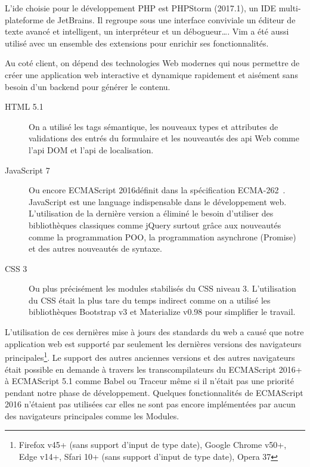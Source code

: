 L'ide choisie pour le développement PHP est PHPStorm (2017.1), un IDE
multi-plateforme de JetBrains. Il regroupe sous une interface conviviale un
éditeur de texte avancé et intelligent, un interpréteur et un débogueur\ldots.
Vim a été aussi utilisé avec un ensemble des extensions pour enrichir ses
fonctionnalités.

Au coté client, on dépend des technologies Web modernes qui nous permettre de
créer une application web interactive et dynamique rapidement et aisément sans
besoin d'un backend pour générer le contenu.

\begin{description}
    \item [HTML 5.1] On a utilisé les tags sémantique, les nouveaux types et
        attributes de validations des entrés du formulaire et les nouveautés
        des api Web comme l'api DOM et l'api de localisation.
    \item [JavaScript 7] Ou encore ECMAScript 2016\textregistered définit dans
        la spécification ECMA-262~\cite{ECMA262}. JavaScript est une language
        indispensable dans le développement web. L'utilisation de la dernière
        version a éliminé le besoin d'utiliser des bibliothèques classiques
        comme jQuery surtout grâce aux nouveautés comme la programmation POO,
        la programmation asynchrone (Promise) et des autres nouveautés de
        syntaxe.
    \item [CSS 3] Ou plus précisément les modules stabilisés du CSS niveau 3.
        L'utilisation du CSS était la plus tare du temps indirect comme on a
        utilisé les bibliothèques Bootstrap v3 et Materialize v0.98 pour
        simplifier le travail.
\end{description}

L'utilisation de ces dernières mise à jours des standards du web a causé que
notre application web est supporté par seulement les dernières versions des
navigateurs principales\footnote{Firefox v45+ (sans support d'input de type
date), Google Chrome v50+, Edge v14+, Sfari 10+ (sans support d'input de type
date), Opera 37}. Le support des autres anciennes versions et des autres
navigateurs était possible en demande à travers les transcompilateurs du
ECMAScript 2016+ à ECMAScript 5.1 comme Babel ou Traceur même si il n'était pas
une priorité pendant notre phase de développement. Quelques fonctionnalités de
ECMAScript 2016 n'étaient pas utilisées car elles ne sont pas encore
implémentées par aucun des navigateurs principales comme les Modules.

